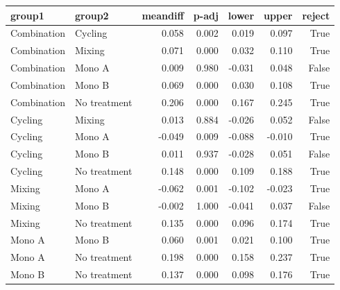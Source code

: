 \begin{tabular}{llrrrrr}
\toprule
group1 & group2 & meandiff & p-adj & lower & upper & reject \\
\midrule
Combination & Cycling & 0.058 & 0.002 & 0.019 & 0.097 & True \\
Combination & Mixing & 0.071 & 0.000 & 0.032 & 0.110 & True \\
Combination & Mono A & 0.009 & 0.980 & -0.031 & 0.048 & False \\
Combination & Mono B & 0.069 & 0.000 & 0.030 & 0.108 & True \\
Combination & No treatment & 0.206 & 0.000 & 0.167 & 0.245 & True \\
Cycling & Mixing & 0.013 & 0.884 & -0.026 & 0.052 & False \\
Cycling & Mono A & -0.049 & 0.009 & -0.088 & -0.010 & True \\
Cycling & Mono B & 0.011 & 0.937 & -0.028 & 0.051 & False \\
Cycling & No treatment & 0.148 & 0.000 & 0.109 & 0.188 & True \\
Mixing & Mono A & -0.062 & 0.001 & -0.102 & -0.023 & True \\
Mixing & Mono B & -0.002 & 1.000 & -0.041 & 0.037 & False \\
Mixing & No treatment & 0.135 & 0.000 & 0.096 & 0.174 & True \\
Mono A & Mono B & 0.060 & 0.001 & 0.021 & 0.100 & True \\
Mono A & No treatment & 0.198 & 0.000 & 0.158 & 0.237 & True \\
Mono B & No treatment & 0.137 & 0.000 & 0.098 & 0.176 & True \\
\bottomrule
\end{tabular}
